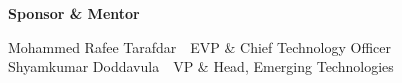 \vspace{1.1cm}

{\color{TNTeal}\fontsize{20}{24}\selectfont\bfseries Sponsor \& Mentor\par}
\vspace{0.6cm}

{\color{TNBodyText}\fontsize{12}{16}\selectfont
Mohammed Rafee Tarafdar\ \textbar\ EVP \& Chief Technology Officer\\
Shyamkumar Doddavula\ \textbar\ VP \& Head, Emerging Technologies\par}

\clearpage